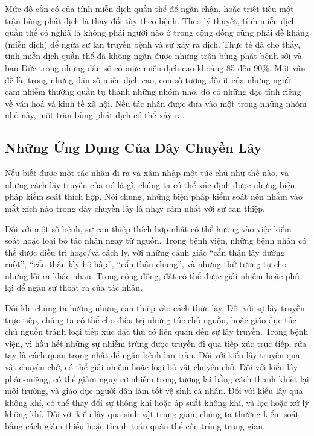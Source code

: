 \documentclass[
]{book}
\begin{document}
Mức độ cần có của tính miễn dịch quần thể để ngăn chận, hoặc triệt tiêu một trận bùng phát dịch là thay đổi tùy theo bệnh. Theo lý thuyết, tính miễn dịch quần thể có nghiã là không phải người nào ở trong cộng đồng cũng phải đề kháng (miễn dịch) để ngừa sự lan truyền bệnh và sự xảy ra dịch. Thực tế đã cho thấy, tính miễn dịch quần thể đã không ngăn được những trận bùng phát bệnh sởi và ban Đức trong những dân số có mức miễn dịch cao khoảng 85 đến 90\%. Một vấn đề là, trong những dân số miễn dịch cao, con số tương đối ít của những người cảm nhiễm thường quần tụ thành những nhóm nhỏ, do có những đặc tính riêng về văn hoá và kinh tế xã hội. Nếu tác nhân được đưa vào một trong những nhóm nhỏ này, một trận bùng phát dịch có thể xảy ra.

\hypertarget{nhux1eefng-ux1ee9ng-dux1ee5ng-cux1ee7a-duxe2y-chuyux1ec1n-luxe2y}{%
\subsection{Những Ứng Dụng Của Dây Chuyền Lây}\label{nhux1eefng-ux1ee9ng-dux1ee5ng-cux1ee7a-duxe2y-chuyux1ec1n-luxe2y}}

Nếu biết được một tác nhân đi ra và xâm nhập một túc chủ như thế nào, và những cách lây truyền của nó là gì, chúng ta có thể xác định được những biện pháp kiểm soát thích hợp. Nói chung, những biện pháp kiểm soát nên nhắm vào mắt xích nào trong dây chuyền lây là nhạy cảm nhất với sự can thiệp.

Đối với một số bệnh, sự can thiệp thích hợp nhất có thể hướng vào việc kiểm soát hoặc loại bỏ tác nhân ngay từ nguồn. Trong bệnh viện, những bệnh nhân có thể được điều trị hoặc/và cách ly, với những cảnh giác ``cẩn thận lây đường ruột'', ``cẩn thận lây hô hấp'', ``cẩn thận chung'', và những thứ tương tự cho những lối ra khác nhau. Trong cộng đồng, đất có thể được giải nhiễm hoặc phủ lại để ngăn sự thoát ra của tác nhân.

Đôi khi chúng ta hướng những can thiệp vào cách thức lây. Đối với sự lây truyền trực tiếp, chúng ta có thể cho điều trị những túc chủ nguồn, hoặc giáo dục túc chủ nguồn tránh loại tiếp xúc đặc thù có liên quan đến sự lây truyền. Trong bệnh viện, vì hầu hết những sự nhiễm trùng được truyền đi qua tiếp xúc trực tiếp, rửa tay là cách quan trọng nhất để ngăn bệnh lan tràn. Đối với kiểu lây truyền qua vật chuyên chở, có thể giải nhiễm hoặc loại bỏ vật chuyên chở. Đối với kiểu lây phân-miệng, có thể giảm nguy cơ nhiễm trong tương lai bằng cách thanh khiết lại môi trường, và giáo dục người dân làm tốt vệ sinh cá nhân. Đối với kiểu lây qua không khí, có thể thay đổi sự thông khí hoặc áp suất không khí, và lọc hoặc xử lý không khí. Đối với kiểu lây qua sinh vật trung gian, chúng ta thường kiểm soát bằng cách giảm thiểu hoặc thanh toán quần thể côn trùng trung gian.
\end{document}

